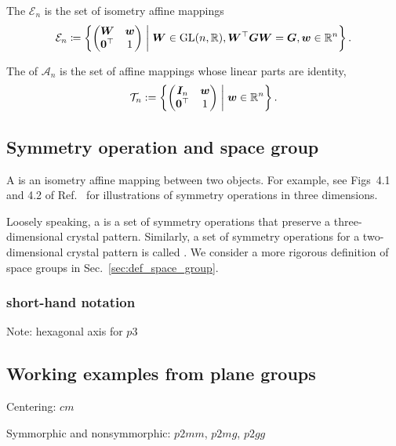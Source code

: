 \begin{screen}
  \begin{definition}
    The  $\mathcal{E}_{n}$ is the set of isometry affine mappings
    \begin{align}
      \mathcal{E}_{n} \coloneqq \left\{  \begin{pmatrix} \bm{W} & \bm{w} \\ \bm{0}^{\top} & 1 \end{pmatrix}  \mathrel{}\middle|\mathrel{}  \bm{W} \in \mathrm{GL}(n, \mathbb{R}), \bm{W}^{\top} \bm{GW} = \bm{G}, \bm{w} \in \mathbb{R}^{n}  \right\}.
    \end{align}
  \end{definition}
\end{screen}

\begin{screen}
  \begin{definition}
    The  of $\mathcal{A}_{n}$ is the set of affine mappings whose linear parts are identity,
    \begin{align}
      \mathcal{T}_{n} := \left\{  \begin{pmatrix} \bm{I}_{n} & \bm{w} \\ \bm{0}^{\top} & 1 \end{pmatrix}  \mathrel{}\middle|\mathrel{}  \bm{w} \in \mathbb{R}^{n}  \right\}.
    \end{align}
  \end{definition}
\end{screen}

\subsection{Symmetry operation and space group}

A  is an isometry affine mapping between two objects.
For example, see Figs~4.1 and 4.2 of Ref.~\cite{muller2013symmetry} for illustrations of symmetry operations in three dimensions.

Loosely speaking, a  is a set of symmetry operations that preserve a three-dimensional crystal pattern.
Similarly, a set of symmetry operations for a two-dimensional crystal pattern is called .
We consider a more rigorous definition of space groups in Sec.~\ref{sec:def_space_group}.

\subsubsection{short-hand notation}

\todo{}

Note: hexagonal axis for $p3$

\subsection{Working examples from plane groups}

\todo{}

Centering: $cm$

Symmorphic and nonsymmorphic: $p2mm$, $p2mg$, $p2gg$
